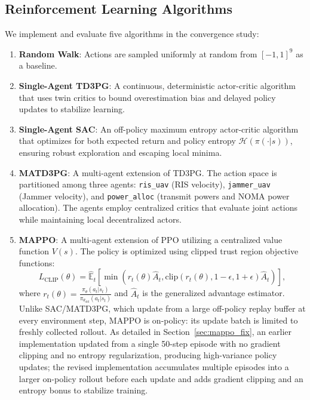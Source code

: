 \documentclass[journal,onecolumn]{IEEEtran}
\begin{document}
\subsection{Reinforcement Learning Algorithms}
We implement and evaluate five algorithms in the convergence study:
\begin{enumerate}
    \item \textbf{Random Walk}: Actions are sampled uniformly at random from $[-1, 1]^9$ as a baseline.
    \item \textbf{Single-Agent TD3PG}: A continuous, deterministic actor-critic algorithm that uses twin critics to bound overestimation bias and delayed policy updates to stabilize learning.
    \item \textbf{Single-Agent SAC}: An off-policy maximum entropy actor-critic algorithm that optimizes for both expected return and policy entropy $\mathcal{H}(\pi(\cdot|s))$, ensuring robust exploration and escaping local minima.
    \item \textbf{MATD3PG}: A multi-agent extension of TD3PG. The action space is partitioned among three agents: \texttt{ris\_uav} (RIS velocity), \texttt{jammer\_uav} (Jammer velocity), and \texttt{power\_alloc} (transmit powers and NOMA power allocation). The agents employ centralized critics that evaluate joint actions while maintaining local decentralized actors.
    \item \textbf{MAPPO}: A multi-agent extension of PPO utilizing a centralized value function $V(s)$. The policy is optimized using clipped trust region objective functions:
    \begin{equation}
        L_{\text{CLIP}}(\theta) = \hat{\mathbb{E}}_t \left[ \min\left( r_t(\theta)\hat{A}_t, \text{clip}(r_t(\theta), 1-\epsilon, 1+\epsilon)\hat{A}_t \right) \right],
    \end{equation}
    where $r_t(\theta) = \frac{\pi_\theta(a_t|s_t)}{\pi_{\theta_{\text{old}}}(a_t|s_t)}$ and $\hat{A}_t$ is the generalized advantage estimator. Unlike SAC/MATD3PG, which update from a large off-policy replay buffer at every environment step, MAPPO is on-policy: its update batch is limited to freshly collected rollout. As detailed in Section~\ref{sec:mappo_fix}, an earlier implementation updated from a single 50-step episode with no gradient clipping and no entropy regularization, producing high-variance policy updates; the revised implementation accumulates multiple episodes into a larger on-policy rollout before each update and adds gradient clipping and an entropy bonus to stabilize training.
\end{enumerate}
\end{document}
